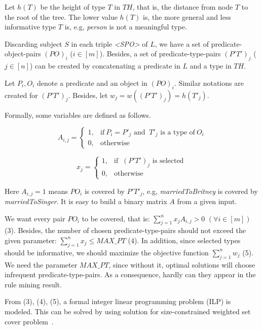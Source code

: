 \documentclass{acm_proc_article-sp}
\begin{document}
Let $h(T)$ be the height of type $T$ in $TH$, that is, the distance from node $T$ to the root of the tree. The lower value $h(T)$ is, the more general and less informative type $T$ is, e.g, \textit{person} is not a meaningful type.

Discarding subject $S$ in each triple \textit{<SPO>} of $L$, we have a set of predicate-object-pairs $(PO)_{i}$ ($i \in [m]$). Besides, a set of predicate-type-pairs $(P'T')_{j}$ ($j \in [n]$) can be created by concatenating a predicate in $L$ and a type in $TH$.

Let $P_{i}, O_{i}$ denote a predicate and an object in $(PO)_{i}$. Similar notations are created for $(P'T')_{j}$. Besides, let $w_{j} = w((P'T')_{j}) = h(T'_{j})$.

Formally, some variables are defined as follows.

\begin{equation}
    A_{i,j} =
    \begin{cases}
      1, & \text{if}\ P_{i} = P'_{j}  \text{ and }\ T'_{j} \text{ is a type of}\ O_{i}\\
      0, & \text{otherwise}
    \end{cases}
\end{equation}

\begin{equation}
    x_{j} =
    \begin{cases}
      1, & \text{if }\ (P'T')_{j} \text{ is selected}\ \\
      0, & \text{otherwise}
    \end{cases}
\end{equation}

Here $A_{i,j} = 1$ means $PO_{i}$ is covered by $P'T'_{j}$, e.g, \textit{marriedToBritney} is covered by \textit{marriedToSinger}. It is easy to build a binary matrix $A$ from a given input.

We want every pair $PO_{i}$ to be covered, that is: $\sum_{j=1}^{n}{x_{j} A_{i,j}} > 0$ $(\forall i \in [m])$ (3). Besides, the number of chosen predicate-type-pairs should not exceed the given parameter: $\sum_{j=1}^{n}{x_{j}} \leq MAX\_PT$ (4). In addition, since selected types should be informative, we should maximize the objective function $\sum_{j=1}^{n}{w_{j}}$ (5). We need the parameter $MAX\_PT$, since without it, optimal solutions will choose infrequent predicate-type-pairs. As a consequence, hardly can they appear in the rule mining result.

From (3), (4), (5), a formal integer linear programming problem (ILP) is modeled. This can be solved by using solution for size-constrained weighted set cover problem~\cite{ref3}.
\end{document}
